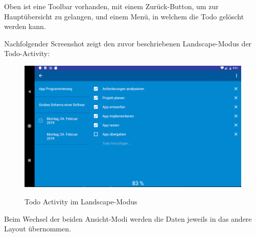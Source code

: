 Oben ist eine Toolbar vorhanden, mit einem Zurück-Button, um zur Hauptübersicht zu gelangen, und einem Menü, in welchem die Todo gelöscht werden kann.

Nachfolgender Screenshot zeigt den zuvor beschriebenen Landscape-Modus der Todo-Activity: 

\begin{figure}[H]
\centering
\begin{minipage}[t]{1\textwidth} %
\caption{Todo Activity im Landscape-Modus} %
\includegraphics[width=1\textwidth]{img/Todo_landscape}\\ %
\end{minipage}
\end{figure}

Beim Wechsel der beiden Ansicht-Modi werden die Daten jeweils in das andere Layout übernommen.

